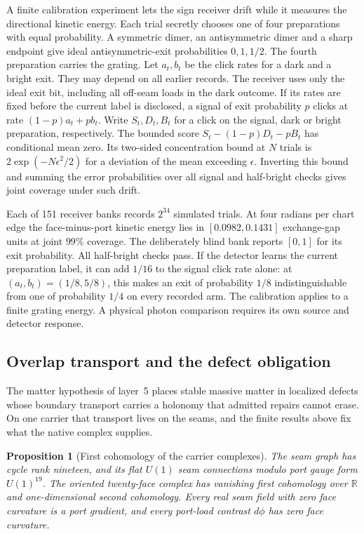 \documentclass[11pt]{article}
\newtheorem{proposition}[theorem]{Proposition}
\theoremstyle{remark}
\theoremstyle{plain}
\begin{document}
A finite calibration experiment lets the sign receiver drift while it
measures the directional kinetic energy. Each trial secretly chooses one
of four preparations with equal probability. A symmetric dimer, an
antisymmetric dimer and a sharp endpoint give ideal antisymmetric-exit
probabilities $0,1,1/2$. The fourth preparation carries the grating.
Let $a_t,b_t$ be the click rates for a dark and a bright exit. They may
depend on all earlier records. The receiver uses only the ideal exit bit,
including all off-seam loads in the dark outcome. If its rates are fixed
before the current label is disclosed, a signal of exit probability $p$ clicks at rate
$(1-p)a_t+p b_t$. Write $S_t,D_t,B_t$ for a click on the signal, dark
or bright preparation, respectively. The bounded score
$S_t-(1-p)D_t-pB_t$ has conditional mean zero. Its two-sided
concentration bound at $N$ trials is $2\exp(-N\epsilon^2/2)$ for a
deviation of the mean exceeding $\epsilon$. Inverting this bound and
summing the error probabilities over all signal and half-bright checks
gives joint coverage under such drift.

Each of 151 receiver banks records $2^{34}$ simulated trials. At four
radians per chart edge the face-minus-port kinetic energy lies in
$[0.0982,0.1431]$ exchange-gap units at joint $99\%$ coverage. The
deliberately blind bank reports $[0,1]$ for its exit probability. All
half-bright checks pass. If the detector learns the current preparation
label, it can add $1/16$ to the signal click rate alone: at
$(a_t,b_t)=(1/8,5/8)$, this makes an exit of probability $1/8$
indistinguishable from one of probability $1/4$ on every recorded arm.
The calibration applies to a finite grating energy. A physical photon
comparison requires its own source and detector response.

\subsection{Overlap transport and the defect obligation}
\label{subsec:carrier-transport-defects}

The matter hypothesis of layer~5 places stable massive matter in localized
defects whose boundary transport carries a holonomy that admitted repairs
cannot erase. On one carrier that transport lives on the seams, and the
finite results above fix what the native complex supplies.

\begin{proposition}[First cohomology of the carrier complexes]
\label{prop:carrier-complex-cohomology}
The seam graph has cycle rank nineteen, and its flat \(U(1)\) seam
connections modulo port gauge form \(U(1)^{19}\). The oriented twenty-face
complex has vanishing first cohomology over \(\mathbb R\) and one-dimensional
second cohomology. Every real seam field with zero face curvature is a port
gradient, and every port-load contrast \(d\phi\) has zero face curvature.
\end{proposition}
\end{document}
